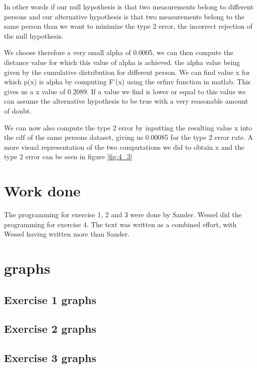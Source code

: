 \documentclass[10pt,a4paper]{article}
\begin{document}
In other words if our null hypothesis is that two measurements belong to different persons and our alternative hypothesis is that two measurements belong to the same person than we want to minimize the type 2 error, the incorrect rejection of the null hypothesis. 

We choose therefore a very small alpha of 0.0005, we can then compute the distance value for which this value of alpha is achieved. the alpha value being given by the cumulative distribution for different person. We can find value x for which p(x) is alpha by computing F'(x) using the erfinv function in matlab. This gives us a x value of 0.2089. If a value we find is lower or equal to this value we can assume the alternative hypothesis to be true with a very reasonable amount of doubt.

We can now also compute the type 2 error by inputting the resulting value x into the cdf of the same persons dataset, giving us 0.00085 for the type 2 error rate. A more visual representation of the two computations we did to obtain x and the type 2 error can be seen in figure \ref{fig:4_3}

\section{Work done}
The programming for exercise 1, 2 and 3 were done by Sander. Wessel did the programming for exercise 4. The text was written as a combined effort, with Wessel having written more than Sander.

\appendix
\section{graphs}
\subsection{Exercise 1 graphs}

\subsection{Exercise 2 graphs}

\subsection{Exercise 3 graphs}
\end{document}
